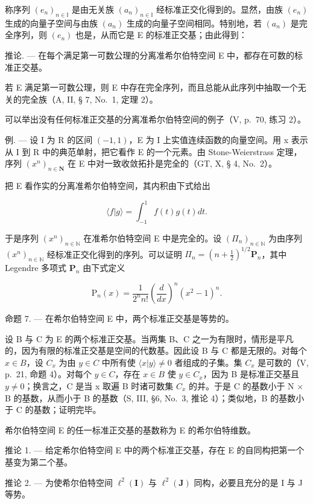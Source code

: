 称序列 \((e_{n})_{n\in\mathbb{I}}\) 是由无关族 \((a_{n})_{n\in\mathbb{I}}\) 经标准正交化得到的。显然，由族 \((e_{n})\) 生成的向量子空间与由族 \((a_{n})\) 生成的向量子空间相同。特别地，若 \((a_{n})\) 是完全序列，则 \((e_{n})\) 也是，从而它是 E 的标准正交基；由此得到：

推论. --- 在每个满足第一可数公理的分离准希尔伯特空间 E 中，都存在可数的标准正交基。

若 E 满足第一可数公理，则 E 中存在完全序列，而且总能从此序列中抽取一个无关的完全族（A, II, § 7, No.~1, 定理 2）。

可以举出没有任何标准正交基的分离准希尔伯特空间的例子（V, p.~70, 练习 2）。

例. --- 设 I 为 R 的区间 \((-1,1)\)，E 为 I 上实值连续函数的向量空间。用 x 表示从 I 到 R 中的典范单射，把它看作 E 的一个元素。由 Stone-Weierstrass 定理，序列 \((x^{n})_{n\in\mathbf{N}}\) 在 E 中对一致收敛拓扑是完全的（GT, X, § 4, No.~2）。

把 E 看作实的分离准希尔伯特空间，其内积由下式给出

\[
\langle f | g \rangle = \int_ {- 1} ^ {1} f (t) g (t) d t.
\]

于是序列 \((x^{n})_{n\in \mathbb{N}}\) 在准希尔伯特空间 E 中是完全的。设 \((\Pi_n)_{n\in \mathbb{N}}\) 为由序列 \((x^n)_{n\in \mathbb{N}}\) 经标准正交化得到的序列。可以证明 \(\Pi_n = (n + \frac{1}{2})^{1 / 2}\mathbf{P}_n\)，其中 Legendre 多项式 \(\mathbf{P}_n\) 由下式定义

\[
\mathrm{P} _ {n} (x) = \frac {1}{2 ^ {n} n !} \left(\frac {d}{d x}\right) ^ {n} (x ^ {2} - 1) ^ {n}.
\]

命题 7. --- 在希尔伯特空间 E 中，两个标准正交基是等势的。

设 B 与 C 为 E 的两个标准正交基。当两集 B、C 之一为有限时，情形是平凡的，因为有限的标准正交基是空间的代数基。因此设 B 与 C 都是无限的。对每个 \(x \in B\)，设 \(C_{x}\) 为由 \(y \in C\) 中所有使 \(\langle x | y \rangle \neq 0\) 者组成的子集。集 \(C_{x}\) 是可数的（V, p.~21, 命题 4）。对每个 \(y \in C\)，存在 \(x \in B\) 使 \(y \in C_{x}\)，因为 B 是标准正交基且 \(y \neq 0\)；换言之，C 是当 x 取遍 B 时诸可数集 \(C_{x}\) 的并。于是 C 的基数小于 N × B 的基数，从而小于 B 的基数（S, III, §6, No.~3, 推论 4）；类似地，B 的基数小于 C 的基数；证明完毕。

希尔伯特空间 E 的任一标准正交基的基数称为 E 的希尔伯特维数。

推论 1. --- 给定希尔伯特空间 E 中的两个标准正交基，存在 E 的自同构把第一个基变为第二个基。

推论 2. --- 为使希尔伯特空间 \(\ell^2 (\mathbf{I})\) 与 \(\ell^2 (\mathbf{J})\) 同构，必要且充分的是 I 与 J 等势。

